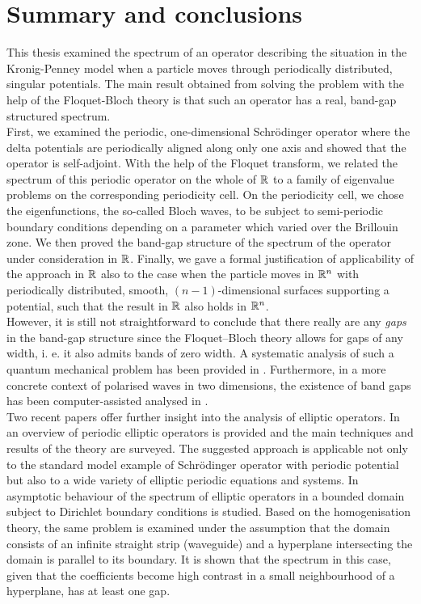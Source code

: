 \chapter{Summary and conclusions} \label{chap:8}
	
This thesis examined the spectrum of an operator describing the situation in the Kronig-Penney model when a particle moves through periodically distributed, singular potentials. The main result obtained from solving the problem with the help of the Floquet-Bloch theory is that such an operator has a real, band-gap structured spectrum.
~\\

First, we examined the periodic, one-dimensional Schrödinger operator where the delta potentials are periodically aligned along only one axis and showed that the operator is self-adjoint. With the help of the Floquet transform, we related the spectrum of this periodic operator on the whole of $\mathbb{R}$ to a family of eigenvalue problems on the corresponding periodicity cell. On the periodicity cell, we chose the eigenfunctions, the so-called Bloch waves, to be subject to semi-periodic boundary conditions depending on a parameter which varied over the Brillouin zone. We then proved the band-gap structure of the spectrum of the operator under consideration in $\mathbb{R}$. Finally, we gave a formal justification of applicability of the approach in $\mathbb{R}$ also to the case when the particle moves in $\mathbb{R}^{n}$ with periodically distributed, smooth, $(n-1)$-dimensional surfaces supporting a potential, such that the result in $\mathbb{R}$ also holds in $\mathbb{R}^{n}$. 
~\\

However, it is still not straightforward to conclude that there really are any \textit{gaps} in the band-gap structure since the Floquet–Bloch theory allows for gaps of any width, i. e. it also admits bands of zero width. A systematic analysis of such a quantum mechanical problem has been provided in \cite{albeverio2012solvable}. Furthermore, in a more concrete context of polarised waves in two dimensions, the existence of band gaps has been computer-assisted analysed in \cite{hoang2009computer}. 
~\\

Two recent papers offer further insight into the analysis of elliptic operators. In \cite{kuchment2016overview} an overview of periodic elliptic operators is provided and the main techniques and results of the theory are surveyed. The suggested approach is applicable not only to the standard model example of Schrödinger operator with periodic potential but also to a wide variety of elliptic periodic equations and systems. In \cite{khrabustovskyi2016spectral} asymptotic behaviour of the spectrum of elliptic operators in a bounded domain subject to Dirichlet boundary conditions is studied. Based on the homogenisation theory, the same problem is examined under the assumption that the domain consists of an infinite straight strip (waveguide) and a hyperplane intersecting the domain is parallel to its boundary. It is shown that the spectrum in this case, given that the coefficients become high contrast in a small neighbourhood of a hyperplane, has at least one gap.